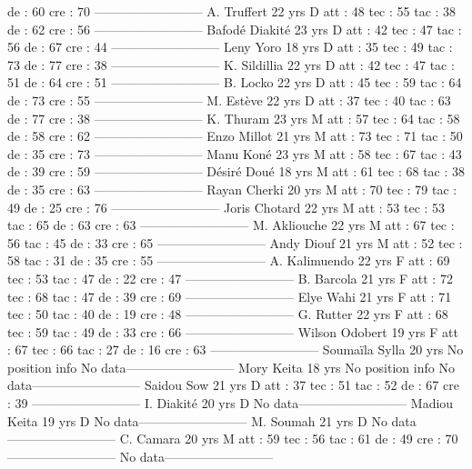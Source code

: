  de : 60 
 cre : 70 
--------------------------
A. Truffert  22 yrs 
D 
 att : 48 
 tec : 55 
 tac : 38 
 de : 62 
 cre : 56 
--------------------------
Bafodé Diakité  23 yrs 
D 
 att : 42 
 tec : 47 
 tac : 56 
 de : 67 
 cre : 44 
--------------------------
Leny Yoro  18 yrs 
D 
 att : 35 
 tec : 49 
 tac : 73 
 de : 77 
 cre : 38 
--------------------------
K. Sildillia  22 yrs 
D 
 att : 42 
 tec : 47 
 tac : 51 
 de : 64 
 cre : 51 
--------------------------
B. Locko  22 yrs 
D 
 att : 45 
 tec : 59 
 tac : 64 
 de : 73 
 cre : 55 
--------------------------
M. Estève  22 yrs 
D 
 att : 37 
 tec : 40 
 tac : 63 
 de : 77 
 cre : 38 
--------------------------
K. Thuram  23 yrs 
M 
 att : 57 
 tec : 64 
 tac : 58 
 de : 58 
 cre : 62 
--------------------------
Enzo Millot  21 yrs 
M 
 att : 73 
 tec : 71 
 tac : 50 
 de : 35 
 cre : 73 
--------------------------
Manu Koné  23 yrs 
M 
 att : 58 
 tec : 67 
 tac : 43 
 de : 39 
 cre : 59 
--------------------------
Désiré Doué  18 yrs 
M 
 att : 61 
 tec : 68 
 tac : 38 
 de : 35 
 cre : 63 
--------------------------
Rayan Cherki  20 yrs 
M 
 att : 70 
 tec : 79 
 tac : 49 
 de : 25 
 cre : 76 
--------------------------
Joris Chotard  22 yrs 
M 
 att : 53 
 tec : 53 
 tac : 65 
 de : 63 
 cre : 63 
--------------------------
M. Akliouche  22 yrs 
M 
 att : 67 
 tec : 56 
 tac : 45 
 de : 33 
 cre : 65 
--------------------------
Andy Diouf  21 yrs 
M 
 att : 52 
 tec : 58 
 tac : 31 
 de : 35 
 cre : 55 
--------------------------
A. Kalimuendo  22 yrs 
F 
 att : 69 
 tec : 53 
 tac : 47 
 de : 22 
 cre : 47 
--------------------------
B. Barcola  21 yrs 
F 
 att : 72 
 tec : 68 
 tac : 47 
 de : 39 
 cre : 69 
--------------------------
Elye Wahi  21 yrs 
F 
 att : 71 
 tec : 50 
 tac : 40 
 de : 19 
 cre : 48 
--------------------------
G. Rutter  22 yrs 
F 
 att : 68 
 tec : 59 
 tac : 49 
 de : 33 
 cre : 66 
--------------------------
Wilson Odobert  19 yrs 
F 
 att : 67 
 tec : 66 
 tac : 27 
 de : 16 
 cre : 63 
--------------------------
Soumaïla Sylla  20 yrs 
No position info 
No data--------------------------
Mory Keita  18 yrs 
No position info 
No data--------------------------
Saidou Sow  21 yrs 
D 
 att : 37 
 tec : 51 
 tac : 52 
 de : 67 
 cre : 39 
--------------------------
I. Diakité  20 yrs 
D 
No data--------------------------
Madiou Keita  19 yrs 
D 
No data--------------------------
M. Soumah  21 yrs 
D 
No data--------------------------
C. Camara  20 yrs 
M 
 att : 59 
 tec : 56 
 tac : 61 
 de : 49 
 cre : 70 
--------------------------
No data--------------------------
